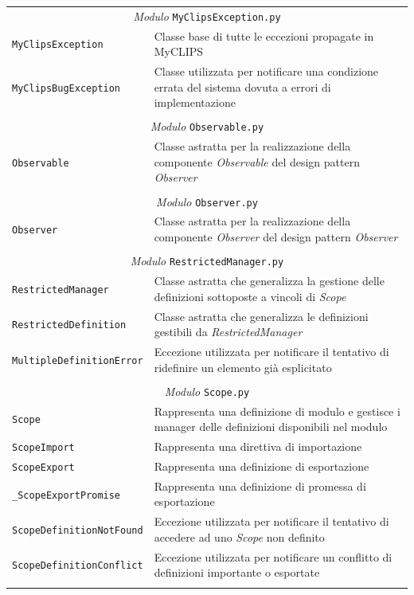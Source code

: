 \begin{longtable}{p{5.5cm}p{6.5cm}}
\multicolumn{2}{c}{\emph{Modulo} \texttt{MyClipsException.py}}\\
	\hdashline[5pt/5pt]
		\texttt{MyClipsException} & Classe base di tutte le eccezioni propagate in MyCLIPS\\ 
	\hdashline[1pt/5pt]
		\texttt{MyClipsBugException} & Classe utilizzata per notificare una condizione errata del sistema dovuta a errori di implementazione\\ 
	\hline\\

\multicolumn{2}{c}{\emph{Modulo} \texttt{Observable.py}}\\
	\hdashline[5pt/5pt]
		\texttt{Observable} & Classe astratta per la realizzazione della componente \emph{Observable} del design pattern \emph{Observer}\\ 
	\hline\\


\multicolumn{2}{c}{\emph{Modulo} \texttt{Observer.py}}\\
	\hdashline[5pt/5pt]
		\texttt{Observer} & Classe astratta per la realizzazione della componente \emph{Observer} del design pattern \emph{Observer}\\ 
	\hline\\

\multicolumn{2}{c}{\emph{Modulo} \texttt{RestrictedManager.py}}\\
	\hdashline[5pt/5pt]
		\texttt{RestrictedManager} & Classe astratta che generalizza la gestione delle definizioni sottoposte a vincoli di \emph{Scope}\\ 
	\hdashline[1pt/5pt]
		\texttt{RestrictedDefinition} & Classe astratta che generalizza le definizioni gestibili da \emph{RestrictedManager}\\ 
	\hdashline[1pt/5pt]
		\texttt{MultipleDefinitionError} & Eccezione utilizzata per notificare il tentativo di ridefinire un elemento già esplicitato\\ 
	\hline\\

\multicolumn{2}{c}{\emph{Modulo} \texttt{Scope.py}}\\
	\hdashline[5pt/5pt]
		\texttt{Scope} & Rappresenta una definizione di modulo e gestisce i manager delle definizioni disponibili nel modulo\\ 
	\hdashline[1pt/5pt]
		\texttt{ScopeImport} & Rappresenta una direttiva di importazione\\ 
	\hdashline[1pt/5pt]
		\texttt{ScopeExport} & Rappresenta una definizione di esportazione\\ 
	\hdashline[1pt/5pt]
		\texttt{\_ScopeExportPromise} & Rappresenta una definizione di promessa di esportazione\\ 
	\hdashline[1pt/5pt]
		\texttt{ScopeDefinitionNotFound} & Eccezione utilizzata per notificare il tentativo di accedere ad uno \emph{Scope} non definito\\ 
	\hdashline[1pt/5pt]
		\texttt{ScopeDefinitionConflict} & Eccezione utilizzata per notificare un conflitto di definizioni importante o esportate\\ 
	\hline\\


\end{longtable}
